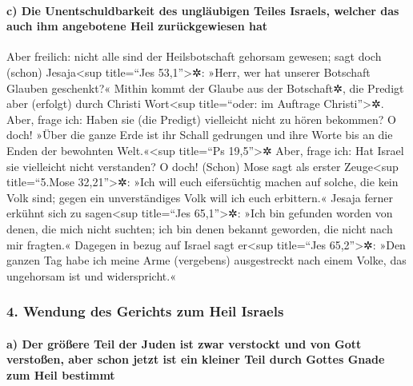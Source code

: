 \hypertarget{c-die-unentschuldbarkeit-des-ungluxe4ubigen-teiles-israels-welcher-das-auch-ihm-angebotene-heil-zuruxfcckgewiesen-hat}{%
\paragraph{c) Die Unentschuldbarkeit des ungläubigen Teiles Israels,
welcher das auch ihm angebotene Heil zurückgewiesen
hat}\label{c-die-unentschuldbarkeit-des-ungluxe4ubigen-teiles-israels-welcher-das-auch-ihm-angebotene-heil-zuruxfcckgewiesen-hat}}

 Aber freilich: nicht alle sind der Heilsbotschaft
gehorsam gewesen; sagt doch (schon) Jesaja\textless sup title=``Jes
53,1''\textgreater✲: »Herr, wer hat unserer Botschaft Glauben
geschenkt?«  Mithin kommt der Glaube aus der Botschaft✲,
die Predigt aber (erfolgt) durch Christi Wort\textless sup title=``oder:
im Auftrage Christi''\textgreater✲.  Aber, frage ich:
Haben sie (die Predigt) vielleicht nicht zu hören bekommen? O doch!
»Über die ganze Erde ist ihr Schall gedrungen und ihre Worte bis an die
Enden der bewohnten Welt.«\textless sup title=``Ps 19,5''\textgreater✲
 Aber, frage ich: Hat Israel sie vielleicht nicht
verstanden? O doch! (Schon) Mose sagt als erster Zeuge\textless sup
title=``5.Mose 32,21''\textgreater✲: »Ich will euch eifersüchtig machen
auf solche, die kein Volk sind; gegen ein unverständiges Volk will ich
euch erbittern.«  Jesaja ferner erkühnt sich zu
sagen\textless sup title=``Jes 65,1''\textgreater✲: »Ich bin gefunden
worden von denen, die mich nicht suchten; ich bin denen bekannt
geworden, die nicht nach mir fragten.«  Dagegen in bezug
auf Israel sagt er\textless sup title=``Jes 65,2''\textgreater✲: »Den
ganzen Tag habe ich meine Arme (vergebens) ausgestreckt nach einem
Volke, das ungehorsam ist und widerspricht.«

\hypertarget{wendung-des-gerichts-zum-heil-israels}{%
\subsubsection{4. Wendung des Gerichts zum Heil
Israels}\label{wendung-des-gerichts-zum-heil-israels}}

\hypertarget{a-der-gruxf6uxdfere-teil-der-juden-ist-zwar-verstockt-und-von-gott-verstouxdfen-aber-schon-jetzt-ist-ein-kleiner-teil-durch-gottes-gnade-zum-heil-bestimmt}{%
\paragraph{a) Der größere Teil der Juden ist zwar verstockt und von Gott
verstoßen, aber schon jetzt ist ein kleiner Teil durch Gottes Gnade zum
Heil
bestimmt}\label{a-der-gruxf6uxdfere-teil-der-juden-ist-zwar-verstockt-und-von-gott-verstouxdfen-aber-schon-jetzt-ist-ein-kleiner-teil-durch-gottes-gnade-zum-heil-bestimmt}}

